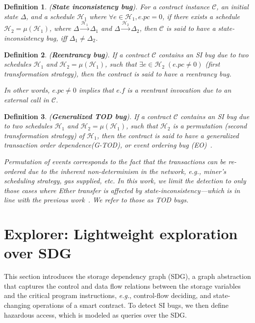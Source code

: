 \documentclass[conference, romanappendices]{tex/IEEEtran}
\theoremstyle{bfnote}
\newcommand{\explorer}{{\sc Explorer}\xspace}
\newcommand{\smart}{smart contract}
\newcommand{\ether}{{Ether}\xspace}
\newcommand{\reentrancy}{{reentrancy}\xspace}
\newcommand{\tod}{{transaction order dependence}\xspace}
\newcommand{\haz}{{hazardous access}\xspace}
\newcommand{\si}{{state-inconsistency}\xspace}
\newcommand{\etc}{\textit{etc.}}
\newcommand{\eg}{\textit{e.g.}}
\newtheorem{definition}{Definition}
\begin{document}
\vspace{-3mm}
\begin{definition}
	(\textbf{State inconsistency bug}).
	For a contract instance $\mathcal{C}$, an initial state $\Delta$, and a schedule $\mathcal{H}_1$ where $\forall e \in \mathcal{H}_1, e.pc = 0$, if there exists a schedule $\mathcal{H}_2 = \mu(\mathcal{H}_1)$, where $\Delta \xrightarrow{\mathcal{H}_1} \Delta_1$ and $\Delta \xrightarrow{\mathcal{H}_2} \Delta_2$, then $\mathcal{C}$ is said to have a \si bug, iff $\Delta_1 \neq \Delta_2$.
\end{definition}

\vspace{-4mm}
\begin{definition}
	(\textbf{Reentrancy bug}).
	If a contract $\mathcal{C}$ contains an SI bug due to two schedules $\mathcal{H}_1$ and $\mathcal{H}_2 = \mu(\mathcal{H}_1)$, such that $\exists e \in \mathcal{H}_2 \;(e.pc \neq 0)$ (first transformation strategy), then the contract is said to have a \reentrancy bug.
	
	
	In other words, $e.pc \neq 0$ implies that $e.f$ is a reentrant invocation due to an external call in $\mathcal{C}$.
\end{definition}

\vspace{-4mm}
\begin{definition}
	(\textbf{Generalized TOD bug}).
	If a contract $\mathcal{C}$ contains an SI bug due to two schedules $\mathcal{H}_1$ and $\mathcal{H}_2 = \mu(\mathcal{H}_1)$, such that $\mathcal{H}_2$ is a permutation  (second transformation strategy) of $\mathcal{H}_1$, then the contract is said to have a generalized \tod (G-TOD), or event ordering bug (EO)~\cite{ethracer}.
	
	Permutation of events corresponds to the fact that the transactions can be re-ordered due to the inherent non-determinism in the network, \eg, miner's scheduling strategy, gas supplied, \etc{}
	In this work, we limit the detection to only those cases where \ether transfer is affected by \si---which is in line with the previous work~\cite{securify, oyente}.
	We refer to those as TOD bugs.
\end{definition} 	\section{\explorer: Lightweight exploration over SDG}
\label{static_analysis}
This section introduces the storage dependency graph (SDG), a graph abstraction that captures the control and data flow relations between the storage variables and the critical program instructions, \eg, control-flow deciding, and state-changing operations of a \smart.
To detect SI bugs, we then define \haz, which is modeled as queries over the SDG.
\end{document}
